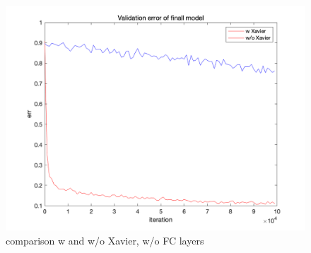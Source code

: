 \documentclass[10pt]{article}
\begin{document}
\begin{figure}[htbp]
  \centering
  \includegraphics[width=0.8\linewidth]{figures/final-plot-2.png}
  \caption{comparison w and w/o Xavier, w/o FC layers}
  \label{fig:final-plot-2}
\end{figure}


%
%
\end{document}

